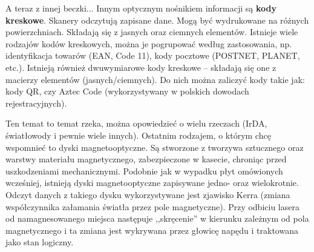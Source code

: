 A teraz z innej beczki... Innym optycznym nośnikiem informacji są \textbf{kody kreskowe}. Skanery odczytują zapisane dane. Mogą być wydrukowane na różnych powierzchniach. Składają się z jasnych oraz ciemnych elementów. Istnieje wiele rodzajów kodów kreskowych, można je pogrupować według zastosowania, np. identyfikacja towarów (EAN, Code 11), kody pocztowe (POSTNET, PLANET, etc.). Istnieją również dwuwymiarowe kody kreskowe -- składają się one z macierzy elementów (jasnych/ciemnych). Do nich można zaliczyć kody takie jak: kody QR, czy Aztec Code (wykorzystywany w polskich dowodach rejestracyjnych).

Ten temat to temat rzeka, można opowiedzieć o wielu rzeczach (IrDA, światłowody i pewnie wiele innych). Ostatnim rodzajem, o którym chcę wspomnieć to dyski magnetooptyczne. Są stworzone z tworzywa sztucznego oraz warstwy materiału magnetycznego, zabezpieczone w kasecie, chroniąc przed uszkodzeniami mechanicznymi. Podobnie jak w wypadku płyt omówionych wcześniej, istnieją dyski magnetooptyczne zapisywane jedno- oraz wielokrotnie. Odczyt danych z takiego dysku wykorzystywane jest zjawisko Kerra (zmiana współczynnika załamania światła przez pole magnetyczne). Przy odbiciu lasera od namagnesowanego miejsca następuje ,,skręcenie'' w kierunku zależnym od pola magnetycznego i ta zmiana jest wykrywana przez głowicę napędu i traktowana jako stan logiczny.
